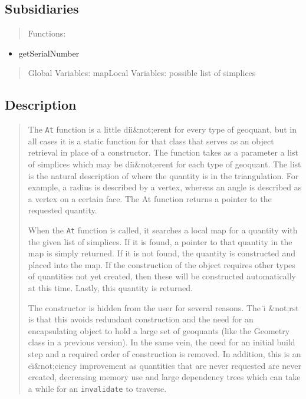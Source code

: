 \subsection*{Subsidiaries}

\begin{quotation}
Functions:
\end{quotation}

\begin{itemize}
\item getSerialNumber
\end{itemize}

\begin{quotation}
Global Variables: mapLocal Variables: possible list of simplices
\end{quotation}

\subsection*{Description}

\begin{quotation}
The \texttt{At} function is a little di\"{\i}\&not;erent for every type of
geoquant, but in all cases it is a static function for that class that
serves as an object retrieval in place of a constructor. The function takes
as a parameter a list of simplices which may be di\"{\i}\&not;erent for each
type of geoquant. The list is the natural description of where the quantity
is in the triangulation. For example, a radius is described by a vertex,
whereas an angle is described as a vertex on a certain face. The At function
returns a pointer to the requested quantity.

When the \texttt{At} function is called, it searches a local map for a
quantity with the given list of simplices. If it is found, a pointer to that
quantity in the map is simply returned. If it is not found, the quantity is
constructed and placed into the map. If the construction of the object
requires other types of quantities not yet created, then these will be
constructed automatically at this time. Lastly, this quantity is returned.

The constructor is hidden from the user for several reasons. The \"{\i}%
\&not;rst is that this avoids redundant construction and the need for an
encapsulating object to hold a large set of geoquants (like the Geometry
class in a previous version). In the same vein, the need for an initial
build step and a required order of construction is removed. In addition,
this is an e\"{\i}\&not;ciency improvement as quantities that are never
requested are never created, decreasing memory use and large dependency
trees which can take a while for an \texttt{invalidate} to traverse.
\end{quotation}

